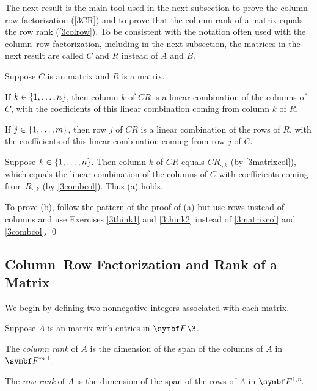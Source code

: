 The next result is the main tool used in the next subsection to prove the column--row factorization (\ref{3CR}) and to prove that the column rank of a matrix equals the row rank (\ref{3colrow}). To be consistent with the notation often used with the column--row factorization, including in the next subsection, the matrices in the next result are called $C$ and $R$ instead of $A$ and $B$.

{Suppose $C$ is an  matrix and $R$ is a  matrix.
\begin{subtheorem}
\item
If $k \in \{1, \ldots, n\}$, then column $k$ of $CR$ is a linear combination of the columns of $C$, with the coefficients of this linear combination coming from column $k$ of $R$.
\item
If $j \in \{1, \ldots, m\}$, then row $j$ of $CR$ is a linear combination of the rows of $R$, with the coefficients of this linear combination coming from row $j$ of $C$.
\end{subtheorem}}

\proof
Suppose $k \in \{1, \ldots, n\}$. Then column $k$ of $CR$ equals $CR_{\cdot, k}$ (by \ref{3matrixcol}), which equals the linear combination of the columns of $C$ with coefficients coming from $R_{\cdot, k}$ (by \ref{3combcol}). Thus (a) holds.

To prove (b), follow the pattern of the proof of (a) but use rows instead of columns and use Exercises \ref{3think1} and \ref{3think2} instead of \ref{3matrixcol} and \ref{3combcol}.
\qed

\subsection{Column--Row Factorization and Rank of a Matrix}

We begin by defining two nonnegative integers associated with each matrix.

{Suppose $A$ is an  matrix with entries in $\F{}\3$.
\begin{Itemize}
\item
The \emph{column rank} of $A$ is the dimension of the span of the columns of $A$ in~$\FF{m,1}$.
\item
The \emph{row rank} of $A$ is the dimension of the span of the rows of $A$ in $\FF{1, n}$.
\end{Itemize}}


